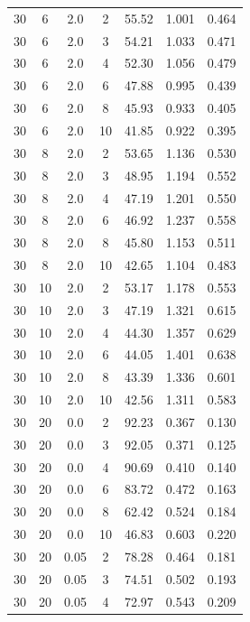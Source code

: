 \documentclass[11pt,a4paper]{article}
\begin{document}
\begin{longtable}{ccccccc}
        30 &  6  &  2.0  & 2 & 55.52 & 1.001 & 0.464 \\
        30 &  6  &  2.0  & 3 & 54.21 & 1.033 & 0.471 \\
        30 &  6  &  2.0  & 4 & 52.30 & 1.056 & 0.479 \\
        30 &  6  &  2.0  & 6 & 47.88 & 0.995 & 0.439 \\
        30 &  6  &  2.0  & 8 & 45.93 & 0.933 & 0.405 \\
        30 &  6  &  2.0  & 10 & 41.85 & 0.922 & 0.395 \\
        \midrule
        30 &  8  &  2.0  & 2 & 53.65 & 1.136 & 0.530 \\
        30 &  8  &  2.0  & 3 & 48.95 & 1.194 & 0.552 \\
        30 &  8  &  2.0  & 4 & 47.19 & 1.201 & 0.550 \\
        30 &  8  &  2.0  & 6 & 46.92 & 1.237 & 0.558 \\
        30 &  8  &  2.0  & 8 & 45.80 & 1.153 & 0.511 \\
        30 &  8  &  2.0  & 10 & 42.65 & 1.104 & 0.483 \\
        \midrule
        30 &  10  &  2.0  & 2 & 53.17 & 1.178 & 0.553 \\
        30 &  10  &  2.0  & 3 & 47.19 & 1.321 & 0.615 \\
        30 &  10  &  2.0  & 4 & 44.30 & 1.357 & 0.629 \\
        30 &  10  &  2.0  & 6 & 44.05 & 1.401 & 0.638 \\
        30 &  10  &  2.0  & 8 & 43.39 & 1.336 & 0.601 \\
        30 &  10  &  2.0  & 10 & 42.56 & 1.311 & 0.583 \\
        \midrule
        30 &  20  &  0.0  & 2 & 92.23 & 0.367 & 0.130 \\
        30 &  20  &  0.0  & 3 & 92.05 & 0.371 & 0.125 \\
        30 &  20  &  0.0  & 4 & 90.69 & 0.410 & 0.140 \\
        30 &  20  &  0.0  & 6 & 83.72 & 0.472 & 0.163 \\
        30 &  20  &  0.0  & 8 & 62.42 & 0.524 & 0.184 \\
        30 &  20  &  0.0  & 10 & 46.83 & 0.603 & 0.220 \\
        \midrule
        30 &  20  &  0.05  & 2 & 78.28 & 0.464 & 0.181 \\
        30 &  20  &  0.05  & 3 & 74.51 & 0.502 & 0.193 \\
        30 &  20  &  0.05  & 4 & 72.97 & 0.543 & 0.209 \\

\end{longtable}
\end{document}
